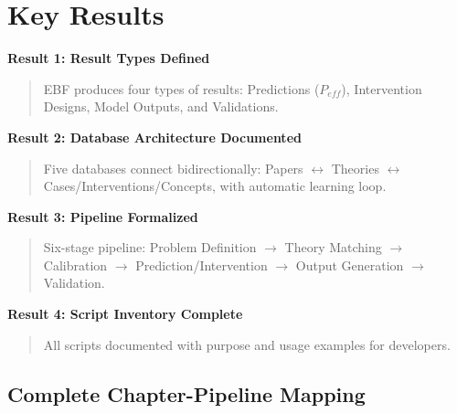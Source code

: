 \section{Key Results}
\label{sec:dp-results-section}

\begin{tcolorbox}[colback=green!5!white, colframe=green!75!black,
    title=\textbf{Key Results of This Appendix}]

\textbf{Result 1: Result Types Defined}
\begin{quote}
EBF produces four types of results: Predictions ($P_{eff}$), Intervention Designs,
Model Outputs, and Validations.
\end{quote}

\textbf{Result 2: Database Architecture Documented}
\begin{quote}
Five databases connect bidirectionally: Papers $\leftrightarrow$ Theories $\leftrightarrow$
Cases/Interventions/Concepts, with automatic learning loop.
\end{quote}

\textbf{Result 3: Pipeline Formalized}
\begin{quote}
Six-stage pipeline: Problem Definition $\rightarrow$ Theory Matching $\rightarrow$
Calibration $\rightarrow$ Prediction/Intervention $\rightarrow$ Output Generation $\rightarrow$ Validation.
\end{quote}

\textbf{Result 4: Script Inventory Complete}
\begin{quote}
All scripts documented with purpose and usage examples for developers.
\end{quote}

\end{tcolorbox}

\subsection{Complete Chapter-Pipeline Mapping}
\label{sec:dp-chapter-mapping}

